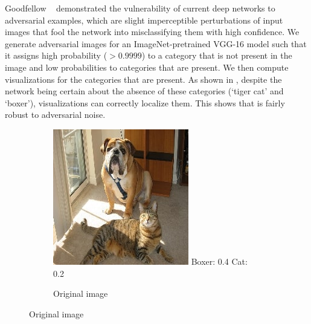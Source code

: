 Goodfellow \etal~\cite{goodfellow2015explaining} demonstrated the
vulnerability of current deep networks to adversarial examples, which
are slight imperceptible perturbations of input images that fool the network into
misclassifying them with high confidence. We generate adversarial
images for an ImageNet-pretrained VGG-16 model such that it assigns high probability
($>0.9999$) to a category that is not present in the image and low probabilities
to categories that are present. We then compute
\gcam{} visualizations for the categories that are present.
As shown in , despite the network
being certain about the absence of these categories (`tiger cat' and `boxer'),
\gcam{} visualizations can correctly localize them.
This shows that \gcam{} is fairly robust to adversarial noise.
\begin{figure}[ht!]
\vspace{-2pt}
  \begin{center}
    \begin{subfigure}[b]{0.32\linewidth}
        \centering
        \includegraphics[width=1\linewidth]{figures/caffe2_figs/vgg_orig_cat_dog.jpg}
        \tiny{Boxer: 0.4   Cat: 0.2} %
		\caption{\tiny{Original image}}


\end{subfigure}
\end{center}
\end{figure}
